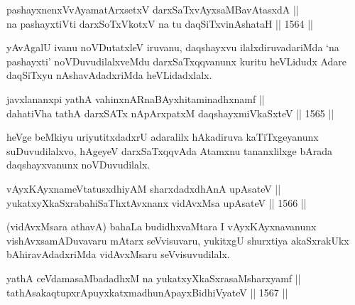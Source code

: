 
\begin{shl}
\footnotemark[4]pashayxnenxVvAyamatArx\s \s setxV darxSaTxvAyxsaMBavAtasxdA || \\
na pashayxtiVti darxSoTxVkotxV na tu daqSiTxvinAshataH ||  1564 ||  
\end{shl}

\begin{artha}
yAvAgalU ivanu noVDutatxleV iruvanu, daqshayxvu ilalxdiruvadariMda `na pashayxti' noVDuvudilalxveMdu darxSaTxqqvanunx kuritu heVLidudx Adare daqSiTxyu nAshavAdadxriMda heVLidadxlalx.
\end{artha}

\begin{shl}
\footnotemark[5]javxlananxpi yathA vahinxnARnaBAyxhitaminadhxnamf || \\
dahatiVha tathA darxSATx nApArxpatxM daqshayxmiVkaSxteV ||  1565 ||  
\end{shl}

\begin{artha}
heVge beMkiyu uriyutitxdadxrU adaralilx hAkadiruva kaTiTxgeyanunx suDuvudilalxvo, hAgeyeV darxSaTxqqvAda Atamxnu tananxlilxge bArada daqshayxvanunx noVDuvudilalx.
\end{artha}



\begin{shl}
vAyxKAyxnameVtatusxdhiyAM sharxdadxdhAnA upAsateV || \\
yukatxyXkaSxrabahiSaThxtAvxnanx vidAvxMsa upAsateV ||  1566 ||  
\end{shl}

\begin{artha}
(vidAvxMsara athavA) bahaLa budidhxvaMtara I vAyxKAyxnavanunx vishAvxsamADuvavaru mAtarx seVvisuvaru, yukitxgU shurxtiya akaSxrakUkx bAhiravAdadxriMda vidAvxMsaru seVvisuvudilalx.
\end{artha}

\begin{shl}
yathA ceVdamasaMbadadhxM na yukatxyXkaSxrasaMsharxyamf || \\
tathA\s sakaqtupxrA\s puyxkatxmadhunA\s payxBidhiVyateV ||  1567 ||  
\end{shl}

